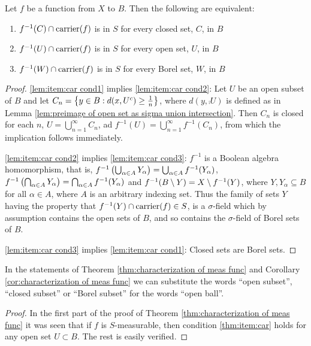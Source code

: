 \begin{lemma}
Let $f$ be a function from $X$ to $B$. Then the following are equivalent:
\begin{enumerate}[label=\arabic*),ref=\arabic*)]
    \item\label{lem:item:car cond1}
    $f^{-1}(C)\cap\operatorname{carrier}(f)$ is in $S$ for every closed set, $C$, in $B$
    \item\label{lem:item:car cond2}
    $f^{-1}(U)\cap\operatorname{carrier}(f)$ is in $S$ for every open set, $U$, in $B$
    \item\label{lem:item:car cond3}
    $f^{-1}(W)\cap\operatorname{carrier}(f)$ is in $S$ for every Borel set, $W$, in $B$
\end{enumerate}
\end{lemma}
\begin{proof}
\ref{lem:item:car cond1} implies \ref{lem:item:car cond2}: Let $U$ be an open subset of $B$ and let $C_n=\left\{y\in B:d(x,{U}^c)\geq\frac1n\right\}$, where $d(y,\comp{U})$ is defined as in Lemma \ref{lem:preimage of open set as sigma union intersection}. Then $C_n$ is closed for each $n$, $U=\bigcup_{n=1}^\infty C_n$, ad $f^{-1}(U)=\bigcup_{n=1}^\infty f^{-1}(C_n)$, from which the implication follows immediately.

\ref{lem:item:car cond2} implies \ref{lem:item:car cond3}: $f^{-1}$ is a Boolean algebra homomorphism, that is, $f^{-1}\left(\bigcup_{\alpha\in A}Y_\alpha\right)=\bigcup_{\alpha\in A}f^{-1}(Y_\alpha)$, $f^{-1}\left(\bigcap_{\alpha\in A}Y_\alpha\right)=\bigcap_{\alpha\in A}f^{-1}(Y_\alpha)$ and $f^{-1}(B\setminus Y)=X\setminus f^{-1}(Y)$, where $Y,Y_\alpha\subseteq B$ for all $\alpha\in A$, where $A$ is an arbitrary indexing set. Thus the family of sets $Y$ having the property that $f^{-1}(Y)\cap\operatorname{carrier}(f)\in S$, is a $\sigma$-field which by assumption contains the open sets of $B$, and so contains the $\sigma$-field of Borel sets of $B$.

\ref{lem:item:car cond3} implies \ref{lem:item:car cond1}: Closed sets are Borel sets.
\end{proof}

\begin{corollary}
In the statements of Theorem \ref{thm:characterization of meas func} and Corollary \ref{cor:characterization of meas func} we can substitute the words ``open subset'', ``closed subset'' or ``Borel subset'' for the words ``open ball''.
\end{corollary}

\begin{proof}
In the first part of the proof of Theorem \ref{thm:characterization of meas func} it was seen that if $f$ is $S$-measurable, then condition \ref{thm:item:car} holds for any open set $U \subset B$. The rest is easily verified.
\end{proof}

